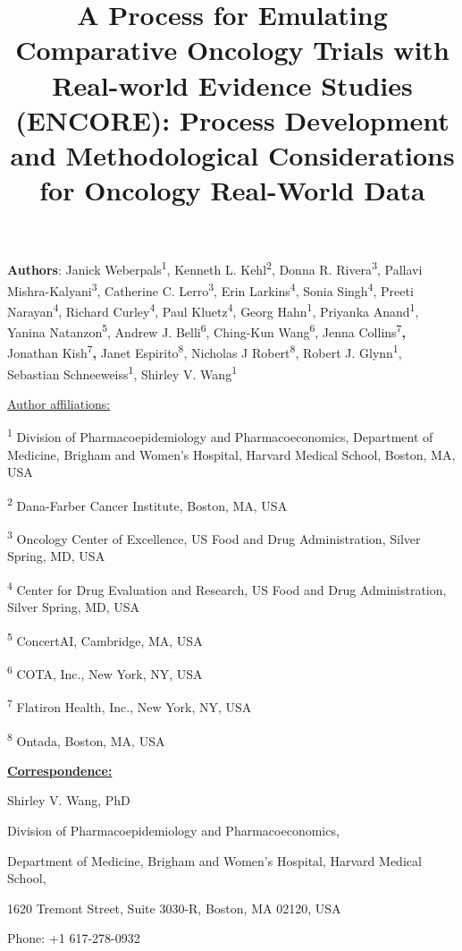 \documentclass[
  letterpaper,
  DIV=11,
  numbers=noendperiod]{scrartcl}
\title{A Process for Emulating Comparative Oncology Trials with
Real-world Evidence Studies (ENCORE): Process Development and
Methodological Considerations for Oncology Real-World Data}
\author{}
\date{}
\begin{document}
\maketitle


\textbf{Authors}: Janick Weberpals\textsuperscript{1}, Kenneth L.
Kehl\textsuperscript{2}, Donna R. Rivera\textsuperscript{3}, Pallavi
Mishra-Kalyani\textsuperscript{3}, Catherine C.
Lerro\textsuperscript{3}, Erin Larkins\textsuperscript{4}, Sonia
Singh\textsuperscript{4}, Preeti Narayan\textsuperscript{4}, Richard
Curley\textsuperscript{4}, Paul Kluetz\textsuperscript{4}, Georg
Hahn\textsuperscript{1}, Priyanka Anand\textsuperscript{1}, Yanina
Natanzon\textsuperscript{5}, Andrew J. Belli\textsuperscript{6},
Ching-Kun Wang\textsuperscript{6}, Jenna
Collins\textsuperscript{7}\textbf{,} Jonathan
Kish\textsuperscript{7}\textbf{,} Janet Espirito\textsuperscript{8},
Nicholas J Robert\textsuperscript{8}, Robert J.
Glynn\textsuperscript{1}, Sebastian Schneeweiss\textsuperscript{1},
Shirley V. Wang\textsuperscript{1}

\ul{Author affiliations:}

\textsuperscript{1} Division of Pharmacoepidemiology and
Pharmacoeconomics, Department of Medicine, Brigham and Women's Hospital,
Harvard Medical School, Boston, MA, USA

\textsuperscript{2} Dana-Farber Cancer Institute, Boston, MA, USA

\textsuperscript{3} Oncology Center of Excellence, US Food and Drug
Administration, Silver Spring, MD, USA

\textsuperscript{4} Center for Drug Evaluation and Research, US Food and
Drug Administration, Silver Spring, MD, USA

\textsuperscript{5} ConcertAI, Cambridge, MA, USA

\textsuperscript{6} COTA, Inc., New York, NY, USA

\textsuperscript{7} Flatiron Health, Inc., New York, NY, USA

\textsuperscript{8} Ontada, Boston, MA, USA

\ul{\textbf{Correspondence:}}

Shirley V. Wang, PhD

Division of Pharmacoepidemiology and Pharmacoeconomics,

Department of Medicine, Brigham and Women's Hospital, Harvard Medical
School,

1620 Tremont Street, Suite 3030-R, Boston, MA 02120, USA

Phone: +1 617-278-0932
\end{document}
